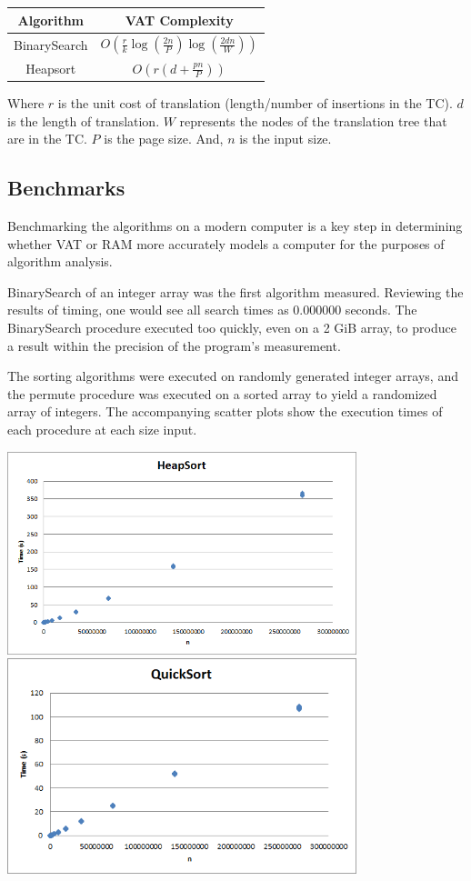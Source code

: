     \begin{tabular}{cc}
      Algorithm    & VAT Complexity\\\hline
      BinarySearch &
$O\left(\frac{r}{k}\log(\frac{2n}{P})\log(\frac{2dn}{W})\right)$ \\
      Heapsort     & $O\left(r(d+\frac{pn}{P})\right)$ \\
    \end{tabular}
    
    Where $r$ is the unit cost of translation (length/number of insertions in
    the TC). $d$ is the length of translation. $W$ represents the nodes of the
    translation tree that are in the TC. $P$ is the page size. And, $n$ is the
    input size.
  
  \subsection{Benchmarks}
    Benchmarking the algorithms on a modern computer is a key step in
    determining whether VAT or RAM more accurately models a computer for the
    purposes of algorithm analysis.
    
    BinarySearch of an integer array was the first algorithm measured.
    Reviewing the results of timing, one would see all search times as 0.000000
    seconds. The BinarySearch procedure executed too quickly, even on a 2 GiB
    array, to produce a result within the precision of the program's
    measurement.
   
    The sorting algorithms were executed on randomly generated integer arrays,
    and the permute procedure was executed on a sorted array to yield a
    randomized array of integers. The accompanying scatter plots show the
    execution times of each procedure at each size input.
   
   \begin{center}
    \includegraphics[width=4in]{heapsort.png}\\
    \includegraphics[width=4in]{quicksort.png}
   \end{center}
   
